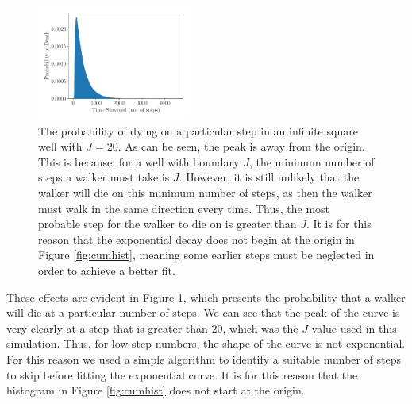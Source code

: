 \documentclass[journal]{IEEEtran}
\begin{document}
\begin{figure}[H]%
  \begin{center}
    \includegraphics[width=0.45\textwidth]{images/exp_plot.pdf}
    \caption{The probability of dying on a particular step in an infinite square
      well with $J=20$. As can be seen, the peak is away from the origin. This
      is because, for a well with boundary $J$, the minimum number of steps a
      walker must take is $J$. However, it is still unlikely that the walker
      will die on this minimum number of steps, as then the walker must walk in
      the same direction every time. Thus, the most probable step for the walker
      to die on is greater than $J$. It is for this reason that the exponential
      decay does not begin at the origin in Figure \ref{fig:cumhist}, meaning
      some earlier steps must be neglected in order to achieve a better fit.}
    \label{fig:hist}
  \end{center}
\end{figure}

These effects are evident in Figure \ref{fig:hist}, which presents the
probability that a walker will die at a particular number of steps. We can see
that the peak of the curve is very clearly at a step that is greater than 20,
which was the $J$ value used in this simulation. Thus, for low step numbers, the
shape of the curve is not exponential. For this reason we used a simple
algorithm to identify a suitable number of steps to skip before fitting the
exponential curve. It is for this reason that the histogram in Figure
\ref{fig:cumhist} does not start at the origin.
\end{document}
